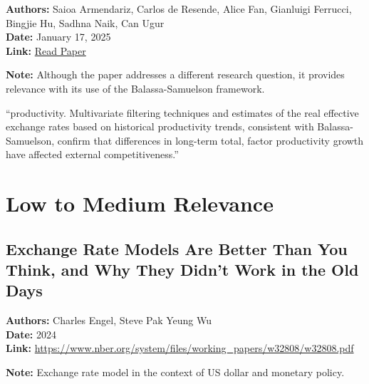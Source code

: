 \documentclass[
  11pt,
]{article}
\begin{document}
\textbf{Authors:} Saioa Armendariz, Carlos de Resende, Alice Fan,
Gianluigi Ferrucci, Bingjie Hu, Sadhna Naik, Can Ugur\\
\textbf{Date:} January 17, 2025\\
\textbf{Link:}
\href{https://drive.google.com/file/d/1GFUm5ckExKBUJ7CXxZ4ZyplTKT2Krc28/view?usp=sharing}{Read
Paper}

\textbf{Note:} Although the paper addresses a different research
question, it provides relevance with its use of the Balassa-Samuelson
framework.

\begin{tcolorbox}[enhanced jigsaw, colbacktitle=quarto-callout-note-color!10!white, title=\textcolor{quarto-callout-note-color}{\faInfo}\hspace{0.5em}{Relevant Quote}, breakable, coltitle=black, leftrule=.75mm, opacitybacktitle=0.6, bottomrule=.15mm, left=2mm, opacityback=0, toptitle=1mm, bottomtitle=1mm, arc=.35mm, titlerule=0mm, rightrule=.15mm, colback=white, colframe=quarto-callout-note-color-frame, toprule=.15mm]

``productivity. Multivariate filtering techniques and estimates of the
real effective exchange rates based on historical productivity trends,
consistent with Balassa-Samuelson, confirm that differences in long-term
total, factor productivity growth have affected external
competitiveness.''

\end{tcolorbox}

\section{Low to Medium Relevance}\label{low-to-medium-relevance}

\subsection{Exchange Rate Models Are Better Than You Think, and Why They
Didn't Work in the Old
Days}\label{exchange-rate-models-are-better-than-you-think-and-why-they-didnt-work-in-the-old-days}

\textbf{Authors:} Charles Engel, Steve Pak Yeung Wu\\
\textbf{Date:} 2024\\
\textbf{Link:}
\url{https://www.nber.org/system/files/working_papers/w32808/w32808.pdf}

\textbf{Note:} Exchange rate model in the context of US dollar and
monetary policy.
\end{document}
